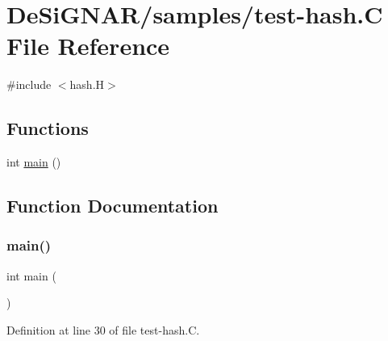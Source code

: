 \hypertarget{test-hash_8_c}{}\section{De\+Si\+G\+N\+A\+R/samples/test-\/hash.C File Reference}
\label{test-hash_8_c}
{\ttfamily \#include $<$hash.\+H$>$}\newline
\subsection*{Functions}
\begin{DoxyCompactItemize}
\item 
int \hyperlink{test-hash_8_c_ae66f6b31b5ad750f1fe042a706a4e3d4}{main} ()
\end{DoxyCompactItemize}


\subsection{Function Documentation}
\mbox{\label{test-hash_8_c_ae66f6b31b5ad750f1fe042a706a4e3d4}} 
\subsubsection{\texorpdfstring{main()}{main()}}
{\footnotesize\ttfamily int main (\begin{DoxyParamCaption}{ }\end{DoxyParamCaption})}



Definition at line 30 of file test-\/hash.\+C.

